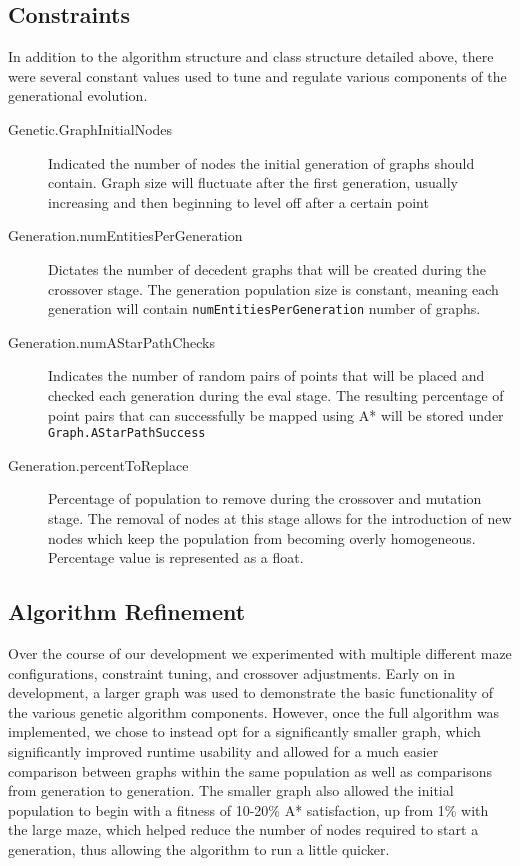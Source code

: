 	\subsection{Constraints}
	In addition to the algorithm structure and class structure detailed above, there were several constant values used to tune and regulate various components of the generational evolution.
	\begin{description}
		\item[Genetic.GraphInitialNodes] Indicated the number of nodes the initial generation of graphs should contain. Graph size will fluctuate after the first generation, usually increasing and then beginning to level off after a certain point
		\item[Generation.numEntitiesPerGeneration] Dictates the number of decedent graphs that will be created during the crossover stage. The generation population size is constant, meaning each generation will contain \texttt{numEntitiesPerGeneration} number of graphs.
		\item[Generation.numAStarPathChecks] Indicates the number of random pairs of points that will be placed and checked each generation during the eval stage. The resulting percentage of point pairs that can successfully be mapped using A* will be stored under \texttt{Graph.AStarPathSuccess}
		\item[Generation.percentToReplace] Percentage of population to remove during the crossover and mutation stage. The removal of nodes at this stage allows for the introduction of new nodes which keep the population from becoming overly homogeneous. Percentage value is represented as a float.
	\end{description}
	
	\subsection{Algorithm Refinement}
	Over the course of our development we experimented with multiple different maze configurations, constraint tuning, and crossover adjustments. Early on in development, a larger graph was used to demonstrate the basic functionality of the various genetic algorithm components. However, once the full algorithm was implemented, we chose to instead opt for a significantly smaller graph, which significantly improved runtime usability and allowed for a much easier comparison between graphs within the same population as well as comparisons from generation to generation. The smaller graph also allowed the initial population to begin with a fitness of 10-20\% A* satisfaction, up from 1\% with the large maze, which helped reduce the number of nodes required to start a generation, thus allowing the algorithm to run a little quicker.
	
